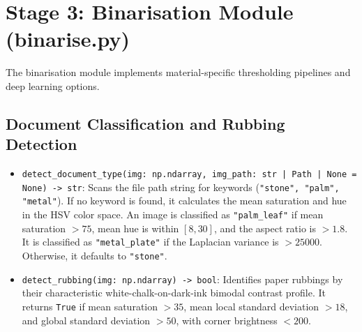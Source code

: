 \section{Stage 3: Binarisation Module (binarise.py)}

The binarisation module implements material-specific thresholding pipelines and deep learning options.

\subsection{Document Classification and Rubbing Detection}
\begin{itemize}
	\item \texttt{detect\_document\_type(img: np.ndarray, img\_path: str | Path | None = None) -> str}:
	Scans the file path string for keywords (\texttt{"stone", "palm", "metal"}). If no keyword is found, it calculates the mean saturation and hue in the HSV color space. An image is classified as \texttt{"palm\_leaf"} if mean saturation $> 75$, mean hue is within $[8, 30]$, and the aspect ratio is $> 1.8$. It is classified as \texttt{"metal\_plate"} if the Laplacian variance is $> 25000$. Otherwise, it defaults to \texttt{"stone"}.
	
	\item \texttt{detect\_rubbing(img: np.ndarray) -> bool}:
	Identifies paper rubbings by their characteristic white-chalk-on-dark-ink bimodal contrast profile. It returns \texttt{True} if mean saturation $> 35$, mean local standard deviation $> 18$, and global standard deviation $> 50$, with corner brightness $< 200$.
\end{itemize}

